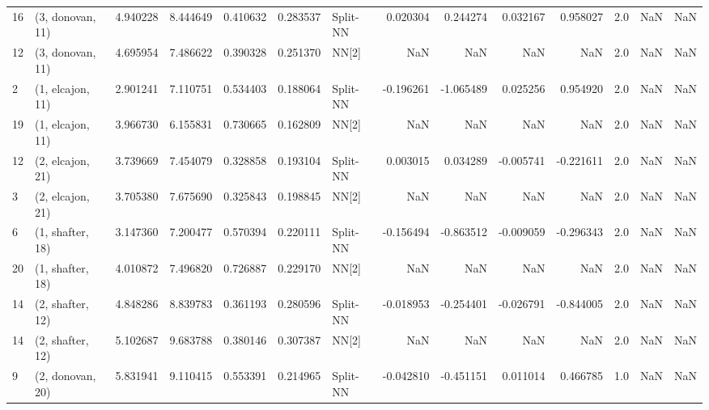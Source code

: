\begin{tabular}{llrrrrlrrrrrrl}
16 &  (3, donovan, 11) &  4.940228 &   8.444649 &   0.410632 &  0.283537 &    Split-NN &        0.020304 &      0.244274 &       0.032167 &     0.958027 &            2.0 &    NaN &              NaN \\
12 &  (3, donovan, 11) &  4.695954 &   7.486622 &   0.390328 &  0.251370 &       NN[2] &             NaN &           NaN &            NaN &          NaN &            2.0 &    NaN &              NaN \\
2  &  (1, elcajon, 11) &  2.901241 &   7.110751 &   0.534403 &  0.188064 &    Split-NN &       -0.196261 &     -1.065489 &       0.025256 &     0.954920 &            2.0 &    NaN &              NaN \\
19 &  (1, elcajon, 11) &  3.966730 &   6.155831 &   0.730665 &  0.162809 &       NN[2] &             NaN &           NaN &            NaN &          NaN &            2.0 &    NaN &              NaN \\
12 &  (2, elcajon, 21) &  3.739669 &   7.454079 &   0.328858 &  0.193104 &    Split-NN &        0.003015 &      0.034289 &      -0.005741 &    -0.221611 &            2.0 &    NaN &              NaN \\
3  &  (2, elcajon, 21) &  3.705380 &   7.675690 &   0.325843 &  0.198845 &       NN[2] &             NaN &           NaN &            NaN &          NaN &            2.0 &    NaN &              NaN \\
6  &  (1, shafter, 18) &  3.147360 &   7.200477 &   0.570394 &  0.220111 &    Split-NN &       -0.156494 &     -0.863512 &      -0.009059 &    -0.296343 &            2.0 &    NaN &              NaN \\
20 &  (1, shafter, 18) &  4.010872 &   7.496820 &   0.726887 &  0.229170 &       NN[2] &             NaN &           NaN &            NaN &          NaN &            2.0 &    NaN &              NaN \\
14 &  (2, shafter, 12) &  4.848286 &   8.839783 &   0.361193 &  0.280596 &    Split-NN &       -0.018953 &     -0.254401 &      -0.026791 &    -0.844005 &            2.0 &    NaN &              NaN \\
14 &  (2, shafter, 12) &  5.102687 &   9.683788 &   0.380146 &  0.307387 &       NN[2] &             NaN &           NaN &            NaN &          NaN &            2.0 &    NaN &              NaN \\
9  &  (2, donovan, 20) &  5.831941 &   9.110415 &   0.553391 &  0.214965 &    Split-NN &       -0.042810 &     -0.451151 &       0.011014 &     0.466785 &            1.0 &    NaN &              NaN \\

\end{tabular}

